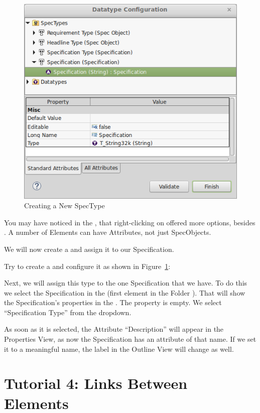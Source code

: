 \begin{figure}
\centering      
\includegraphics[width=0.8\linewidth]{../rmf-images/new_spectype.png}      
\caption{Creating a New SpecType}      
\label{fig:newSpecType}
\end{figure}

You may have noticed in the , that right-clicking on  offered more options, besides .  A number of Elements can have Attributes, not just SpecObjects.

We will now create a  and assign it to our Specification.

Try to create a  and configure it as shown in Figure~\ref{fig:newSpecType}:

Next, we will assign this type to the one Specification that we have.  To do this we select the Specification in the  (first element in the Folder ).  That will show
the Specification's properties in the .  The  property is empty.  We select ``Specification Type'' from the dropdown.

As soon as it is selected, the Attribute ``Description'' will appear in the Properties View, as now the Specification has an attribute of that name.  If we set it to a meaningful name, the label in the Outline View will change as well.

\section{Tutorial 4: Links Between Elements}

